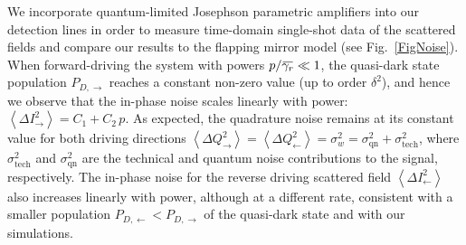 \documentclass[pra, twocolumn, amsmath, amssymb, notitlepage, longbibliography, showpacs, superscriptaddress]{revtex4-1}
\newcommand{\mean}[1]{\ensuremath{\left\langle #1\r\rangle}}
\renewcommand{\r}[0]{\right}
\newcommand{\overbar}[1]{\mkern 1.5mu\overline{\mkern-1.5mu#1\mkern-1.5mu}\mkern 1.5mu}
\begin{document}
We incorporate quantum-limited Josephson parametric amplifiers  
into our detection lines in order to measure time-domain single-shot data 
of the scattered fields and compare our results to the
flapping mirror model (see Fig.~\ref{FigNoise}). 
When forward-driving the system with powers $p/\overbar{\gamma_r} \ll 1 $, 
the quasi-dark state population $P_{D,\rightarrow}$ reaches a constant non-zero value (up to order 
$\delta^2$), and hence we observe that
the in-phase noise scales linearly with power: $\mean{\Delta I^2_\rightarrow} = C_1 + C_2 \, p$. 
As expected, the quadrature
noise remains at its constant value for both driving directions
$\mean{\Delta Q^2_\rightarrow} = \mean{\Delta Q^2_\leftarrow} = \sigma_w^2 = \sigma_\textrm{qn}^2 + \sigma_{\textrm{tech}}^2$,
where $\sigma_{\textrm{tech}}^2$ and $\sigma_\textrm{qn}^2$ are the technical and quantum noise
  contributions to the signal, respectively.
The in-phase noise for the reverse driving scattered field $\mean{\Delta I^2_\leftarrow}$ also increases
linearly with power, although at a different rate, 
consistent with a smaller population $P_{D,\leftarrow} < P_{D,\rightarrow}$
of the quasi-dark state and with our simulations.
\end{document}
